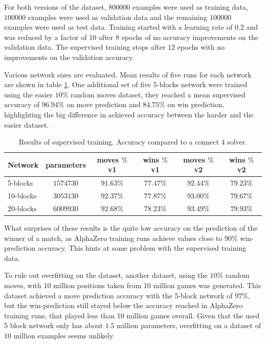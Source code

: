 \documentclass[12pt,onecolumn,oneside,titlepage]{article}
\begin{document}
For both versions of the dataset, $800000$ examples were used as training data, $100000$ examples were used as validation data and the remaining $100000$ examples were used as test data.
Training started with a learning rate of $0.2$ and was reduced by a factor of $10$ after $8$ epochs of no accuracy improvements on the validation data. The supervised training stops after $12$ epochs with no improvements on the validation accuracy.

Various network sizes are evaluated. Mean results of five runs for each network are shown in table \ref{t:supervised_results}. One additional set of five 5-blocks network were trained using the easier $10\%$ random moves dataset, they reached a mean supervised accuracy
of $96.94\%$ on move prediction and $84.75\%$ on win prediction, highlighting the big difference in achieved accuracy between the harder and the easier dataset.

\begin{table} [H]
 \centering
  \begin{tabular}{ l | c c c c c }
  Network & parameters & moves $\%$ v1 & wins $\%$ v1 & moves $\%$ v2 & wins $\%$ v2 \\
  \hline
  5-blocks & $1574730$ & $91.63\%$ & $77.47\%$ & $92.44\%$ & $79.23\%$ \\
  10-blocks & $3053130$ & $92.37\%$ & $77.87\%$ & $93.00\%$ & $79.67\%$ \\
  20-blocks & $6009930$ & $92.68\%$ & $78.23\%$ & $93.49\%$ & $79.93\%$ \\
  \end{tabular}
  \caption{Results of supervised training. Accuracy compared to a connect 4 solver.}
  \label{t:supervised_results}
\end{table}


What surprises of these results is the quite low accuracy on the prediction of the winner of a match, as AlphaZero training runs achieve values close to $90\%$ win-prediction accuracy.
This hints at some problem with the supervised training data.

To rule out overfitting on the dataset, another dataset, using the $10\%$ random moves, with 10 million positions taken from 10 million games was generated. This dataset achieved a move prediction accuracy with the 5-block network 
of $97\%$, but the win-prediction still stayed below the accuracy reached in AlphaZero training runs, that played less than 10 million games overall.
Given that the used 5 block network only has about $1.5$ million parameters, overfitting on a dataset of $10$ million examples seems unlikely.
\end{document}
